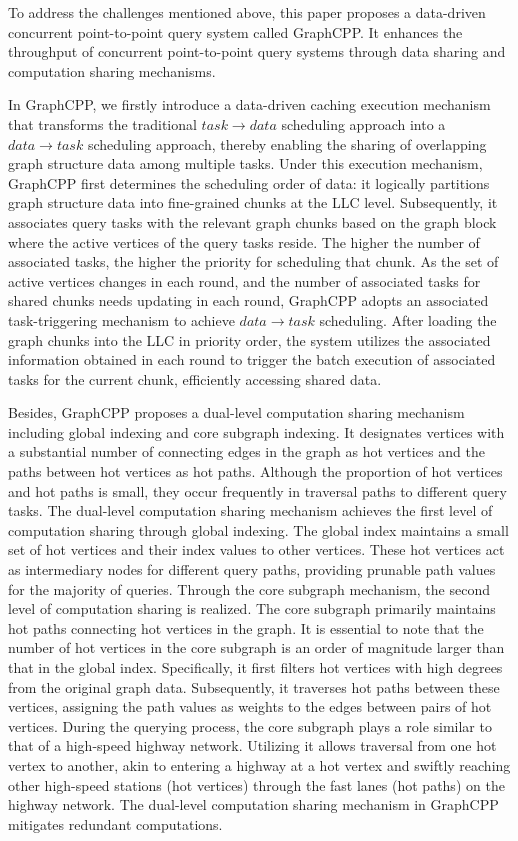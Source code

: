 \documentclass[lettersize,journal]{IEEEtran} %
\begin{document}
To address the challenges mentioned above, this paper proposes a data-driven concurrent point-to-point query system called GraphCPP. It enhances the throughput of concurrent point-to-point query systems through data sharing and computation sharing mechanisms.

In GraphCPP, we firstly introduce a data-driven caching execution mechanism that transforms the traditional $task \rightarrow data$ scheduling approach into a $data \rightarrow task$ scheduling approach, thereby enabling the sharing of overlapping graph structure data among multiple tasks. Under this execution mechanism, GraphCPP first determines the scheduling order of data: it logically partitions graph structure data into fine-grained chunks at the LLC level. Subsequently, it associates query tasks with the relevant graph chunks based on the graph block where the active vertices of the query tasks reside. The higher the number of associated tasks, the higher the priority for scheduling that chunk. As the set of active vertices changes in each round, and the number of associated tasks for shared chunks needs updating in each round, GraphCPP adopts an associated task-triggering mechanism to achieve $data \rightarrow task$ scheduling. After loading the graph chunks into the LLC in priority order, the system utilizes the associated information obtained in each round to trigger the batch execution of associated tasks for the current chunk, efficiently accessing shared data.

Besides, GraphCPP proposes a dual-level computation sharing mechanism including global indexing and core subgraph indexing. It designates vertices with a substantial number of connecting edges in the graph as hot vertices and the paths between hot vertices as hot paths. Although the proportion of hot vertices and hot paths is small, they occur frequently in traversal paths to different query tasks. The dual-level computation sharing mechanism achieves the first level of computation sharing through global indexing. The global index maintains a small set of hot vertices and their index values to other vertices. These hot vertices act as intermediary nodes for different query paths, providing prunable path values for the majority of queries. Through the core subgraph mechanism, the second level of computation sharing is realized. The core subgraph primarily maintains hot paths connecting hot vertices in the graph. It is essential to note that the number of hot vertices in the core subgraph is an order of magnitude larger than that in the global index. Specifically, it first filters hot vertices with high degrees from the original graph data. Subsequently, it traverses hot paths between these vertices, assigning the path values as weights to the edges between pairs of hot vertices. During the querying process, the core subgraph plays a role similar to that of a high-speed highway network. Utilizing it allows traversal from one hot vertex to another, akin to entering a highway at a hot vertex and swiftly reaching other high-speed stations (hot vertices) through the fast lanes (hot paths) on the highway network. The dual-level computation sharing mechanism in GraphCPP mitigates redundant computations.
\end{document}
